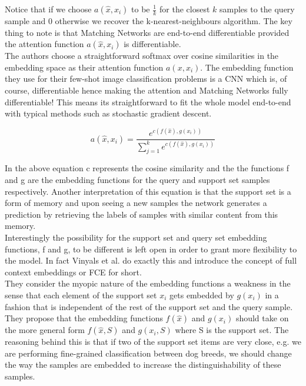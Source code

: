 \documentclass[runningheads,a4paper]{llncs}
\begin{document}
Notice that if we choose $a(\hat{x}, x_i)$ to be $\frac{1}{k}$ for the closest $k$ samples to the query sample and 0 otherwise we recover the k-nearest-neighbours algorithm. The key thing to note is that Matching Networks are end-to-end differentiable provided the attention function $a(\hat{x}, x_i)$ is differentiable. \\

The authors choose a straightforward softmax over cosine similarities in the embedding space as their attention function $a(x, x_i)$. The embedding function they use for their few-shot image classification problems is a CNN which is, of course, differentiable hence making the attention and Matching Networks fully differentiable! This means its straightforward to fit the whole model end-to-end with typical methods such as stochastic gradient descent.

\begin{equation}
a(\hat{x}, x_i) = \frac{e^{c(f(\hat{x}), g(x_i))}}{\sum_{j=1}^{k} e^{c(f(\hat{x}), g(x_i))}}
\end{equation}

In the above equation c represents the cosine similarity and the the functions f and g are the embedding functions for the query and support set samples respectively. Another interpretation of this equation is that the support set is a form of memory and upon seeing a new samples the network generates a prediction by retrieving the labels of samples with similar content from this memory. \\

Interestingly the possibility for the support set and query set embedding functions, f and g, to be different is left open in order to grant more flexibility to the model. In fact Vinyals et al. do exactly this and introduce the concept of full context embeddings or FCE for short. \\

They consider the myopic nature of the embedding functions a weakness in the sense that each element of the support set $x_i$ gets embedded by $g(x_i)$ in a fashion that is independent of the rest of the support set and the query sample. They propose that the embedding functions $f(\hat{x})$ and $g(x_i)$ should take on the more general form $f(\hat{x}, S)$ and $g(x_i, S)$ where S is the support set. The reasoning behind this is that if two of the support set items are very close, e.g. we are performing fine-grained classification between dog breeds, we should change the way the samples are embedded to increase the distinguishability of these samples. \\
\end{document}
